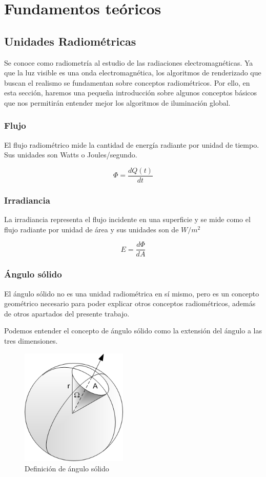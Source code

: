 \chapter{Fundamentos teóricos}

\section{Unidades Radiométricas}
Se conoce como radiometría al estudio de las radiaciones electromagnéticas. Ya que la luz visible es una onda electromagnética, los algoritmos de renderizado que buscan el realismo se fundamentan sobre conceptos radiométricos. Por ello, en esta sección, haremos una pequeña introducción sobre algunos conceptos básicos que nos permitirán entender mejor los algoritmos de iluminación global.  
\subsection{Flujo}

El flujo radiométrico mide la cantidad de energía radiante por unidad de tiempo. Sus unidades son Watts o Joules/segundo.

\begin{equation}
\Phi = \frac{dQ(t)}{dt}
\end{equation}

\subsection{Irradiancia}
La irradiancia representa el flujo incidente en una superficie y se mide como el flujo radiante por unidad de área y sus unidades son de $W/m^2$ 

\begin{equation}
E = \frac{d\Phi}{dA}
\end{equation}

\clearpage

\subsection{Ángulo sólido}
El ángulo sólido no es una unidad radiométrica en sí mismo, pero es un concepto geométrico necesario para poder explicar otros conceptos radiométricos, además de otros apartados del presente trabajo.

Podemos entender el concepto de ángulo sólido como la extensión del ángulo a las tres dimensiones.
\begin{figure}[h]
\centering
\includegraphics[width=2in]{Solid_Angle.png}
\caption{Definición de ángulo sólido \cite{Haade}}
\end{figure}

